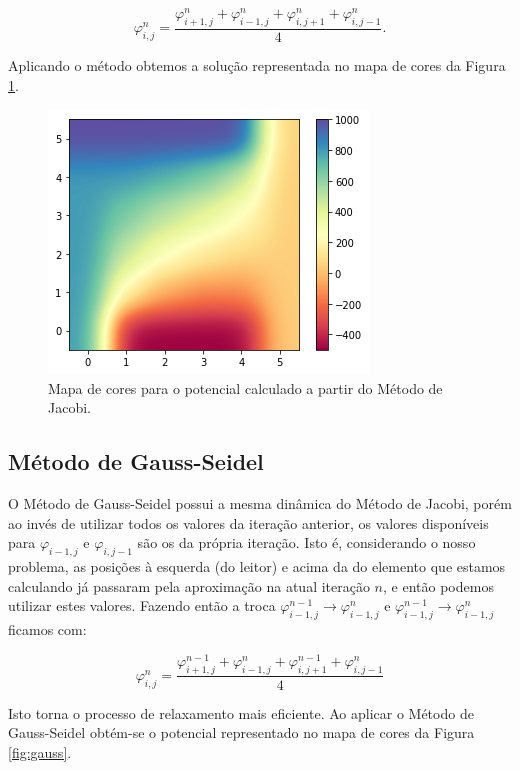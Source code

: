 \documentclass[a4paper,12pt]{article}
\begin{document}
\begin{equation}
  \varphi_{i,j}^n = \frac{\varphi_{i+1,j}^{n}+\varphi_{i-1,j}^{n}+\varphi_{i,j+1}^{n}+\varphi_{i,j-1}^{n}}{4}.
  \label{eq:num_sol_it}
\end{equation}

Aplicando o método obtemos a solução representada no mapa de cores da Figura \ref{fig:jacobi}.

\begin{figure}[H]
\centering
\includegraphics[scale=0.7]{img/jacobi_potential}
  \caption{Mapa de cores para o potencial calculado a partir do Método de Jacobi.}
  \label{fig:jacobi}
\end{figure}

\subsection*{Método de Gauss-Seidel}

O Método de Gauss-Seidel possui a mesma dinâmica do Método de Jacobi, porém ao invés de utilizar todos os valores da
iteração anterior, os valores disponíveis para $\varphi_{i-1, j}$ e $\varphi_{i,j- 1}$ são os da própria iteração. Isto é, considerando o nosso problema, as posições à esquerda (do leitor) e acima da do elemento que estamos calculando já passaram pela aproximação na atual iteração $n$, e então podemos utilizar estes valores. Fazendo então a troca $\varphi_{i-1,j}^{n-1} \rightarrow \varphi_{i-1,j}^{n}$ e $\varphi_{i-1,j}^{n-1} \rightarrow \varphi_{i-1,j}^{n}$ ficamos com:

\begin{equation}
  \varphi_{i,j}^n = \frac{\varphi_{i+1,j}^{n-1}+\varphi_{i-1,j}^{n}+\varphi_{i,j+1}^{n-1}+\varphi_{i,j-1}^{n}}{4}
\end{equation}

Isto torna o processo de relaxamento mais eficiente. Ao aplicar o Método  de Gauss-Seidel obtém-se o potencial representado no mapa de cores da Figura \ref{fig:gauss}.
\end{document}
